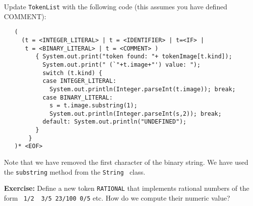 \documentclass{article}
\begin{document}
Update {\tt TokenList} with the following code (this assumes you have defined COMMENT):
\begin{verbatim}
   (
     (t = <INTEGER_LITERAL> | t = <IDENTIFIER> | t=<IF> | 
      t = <BINARY_LITERAL> | t = <COMMENT> )
         { System.out.print("token found: "+ tokenImage[t.kind]);
           System.out.print(" (`"+t.image+"') value: "); 
           switch (t.kind) {
           case INTEGER_LITERAL:
             System.out.println(Integer.parseInt(t.image)); break;
           case BINARY_LITERAL:
             s = t.image.substring(1);
             System.out.println(Integer.parseInt(s,2)); break;
           default: System.out.println("UNDEFINED");
         }
       }
   )* <EOF>
\end{verbatim}

Note that we have removed the first character of the binary string. We have used the {\tt substring} method from the {\tt String } class.

\textbf{Exercise:} Define a new token \verb+RATIONAL+ that implements rational numbers of the form \verb+ 1/2  3/5 23/100 0/5+ etc. How do we compute their numeric value?
\end{document}
